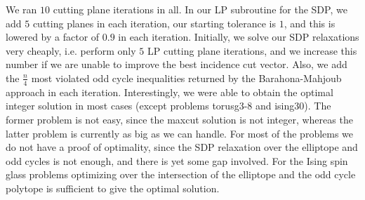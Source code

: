 \documentclass[12pt]{article}
\begin{document}
We ran $10$ cutting plane iterations in all. In our LP subroutine
for the SDP, we add $5$ cutting planes in each iteration, our
starting tolerance is $1$, and this is lowered by a factor of $0.9$ in each
iteration. Initially, we solve our SDP relaxations very cheaply,
i.e. perform only $5$ LP cutting plane iterations, and we increase
this number if we are unable to improve the best incidence cut
vector. Also, we add the $\frac{n}{4}$ most violated odd cycle
inequalities returned by the Barahona-Mahjoub approach in each
iteration.
%
Interestingly, we were able to obtain the optimal integer solution
in most cases (except problems torusg3-8 and ising30). The former
problem is not easy, since the maxcut solution is not integer,
whereas the latter problem is currently as big as we can handle.
For most of the problems we do not have a proof of optimality,
since the SDP relaxation over the elliptope and odd cycles is not
enough, and there is yet some gap involved. For the Ising spin
glass problems optimizing over the intersection of the elliptope
and the odd cycle polytope is sufficient to give the optimal
solution.
\end{document}

